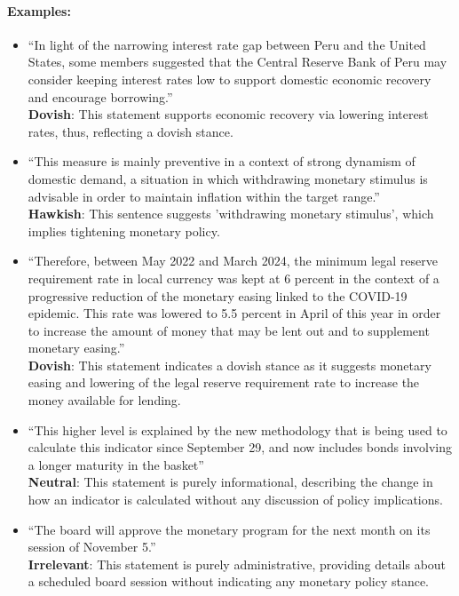 \paragraph{Examples: }
\begin{itemize}
    \item ``In light of the narrowing interest rate gap between Peru and the United States, some members suggested that the Central Reserve Bank of Peru may consider keeping interest rates low to support domestic economic recovery and encourage borrowing.''\\
    \textbf{Dovish}: This statement supports economic recovery via lowering interest rates, thus, reflecting a dovish stance.

    \item ``This measure is mainly preventive in a context of strong dynamism of domestic demand, a situation in which withdrawing monetary stimulus is advisable in order to maintain inflation within the target range.''\\
    \textbf{Hawkish}: This sentence suggests 'withdrawing monetary stimulus', which implies tightening monetary policy. 

    \item ``Therefore, between May 2022 and March 2024, the minimum legal reserve requirement rate in local currency was kept at 6 percent in the context of a progressive reduction of the monetary easing linked to the COVID-19 epidemic. This rate was lowered to 5.5 percent in April of this year in order to increase the amount of money that may be lent out and to supplement monetary easing.''\\
    \textbf{Dovish}: This statement indicates a dovish stance as it suggests monetary easing and  lowering of the legal reserve requirement rate to increase the money available for lending. 

     \item ``This higher level is explained by the new methodology that is being used to calculate this indicator since September 29, and now includes bonds involving a longer maturity in the basket''\\
    \textbf{Neutral}: This statement is purely informational, describing the change in how an indicator is calculated without any discussion of policy implications.
     \\

    \item ``The board will approve the monetary program for the next month on its session of November 5.''\\
    \textbf{Irrelevant}: This statement is purely administrative, providing details about a scheduled board session without indicating any monetary policy stance.
\end{itemize}


